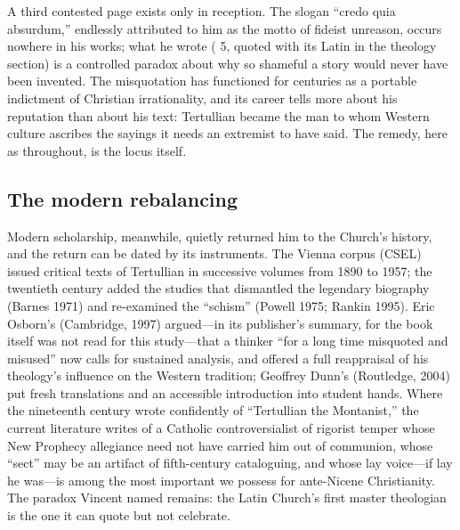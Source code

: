 A third contested page exists only in reception. The slogan ``credo quia
absurdum,'' endlessly attributed to him as the motto of fideist unreason,
occurs nowhere in his works; what he wrote ( 5,
quoted with its Latin in the theology section) is a controlled paradox about
why so shameful a story would never have been invented. The misquotation has
functioned for centuries as a portable indictment of Christian
irrationality, and its career tells more about his reputation than about his
text: Tertullian became the man to whom Western culture ascribes the sayings
it needs an extremist to have said. The remedy, here as throughout, is the
locus itself.

\subsection{The modern rebalancing}

Modern scholarship, meanwhile, quietly returned him to the Church's history,
and the return can be dated by its instruments. The Vienna corpus (CSEL)
issued critical texts of Tertullian in successive volumes from 1890 to 1957;
the twentieth century added the studies that dismantled the legendary
biography (Barnes 1971) and re-examined the ``schism'' (Powell 1975; Rankin
1995). Eric Osborn's 
(Cambridge, 1997) argued---in its publisher's summary, for the book itself
was not read for this study---that a thinker ``for a long time misquoted and
misused'' now calls for sustained analysis, and offered a full reappraisal of
his theology's influence on the Western tradition; Geoffrey Dunn's
 (Routledge, 2004) put fresh translations and an accessible
introduction into student hands. Where the nineteenth century wrote
confidently of ``Tertullian the Montanist,'' the current literature writes of
a Catholic controversialist of rigorist temper whose New Prophecy allegiance
need not have carried him out of communion, whose ``sect'' may be an artifact
of fifth-century cataloguing, and whose lay voice---if lay he was---is among
the most important we possess for ante-Nicene Christianity. The paradox
Vincent named remains: the Latin Church's first master theologian is the one
it can quote but not celebrate.
